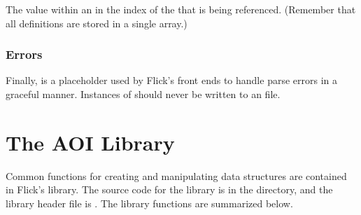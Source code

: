 The  value within an  in the index of the
 that is being referenced.  (Remember that all \AOI{} definitions
are stored in a single array.)


\subsubsection{Errors}

Finally,  is a placeholder used by Flick's front ends to handle
\IDL{} parse errors in a graceful manner.  Instances of  should
never be written to an \AOI{} file.



\section{The AOI Library}
\label{sec:AOI:The AOI Library}

Common functions for creating and manipulating \AOI{} data structures are
contained in Flick's \AOI{} library.  The source code for the library is in the
 directory, and the library header file is
.  The library functions are summarized below.

